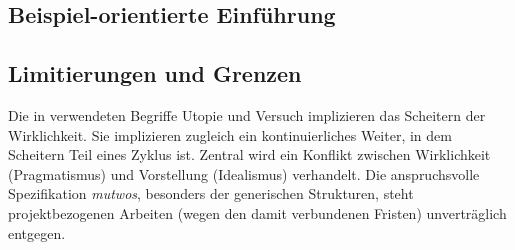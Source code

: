 \documentclass[12pt,a4paper,ngerman]{article}
\begin{document}

\subsection{Beispiel-orientierte Einführung}

%
%
%
%
%
%
%












\subsection{Limitierungen und Grenzen}
\label{limitsAndBorders}

Die in \emph{} verwendeten Begriffe Utopie und Versuch implizieren das Scheitern der Wirklichkeit.
Sie implizieren zugleich ein kontinuierliches Weiter, in dem Scheitern Teil eines Zyklus ist.
Zentral wird ein Konflikt zwischen Wirklichkeit (Pragmatismus) und Vorstellung (Idealismus) verhandelt.
Die anspruchsvolle Spezifikation \emph{mutwos}, besonders der generischen Strukturen, steht projektbezogenen Arbeiten (wegen den damit verbundenen Fristen) unverträglich entgegen.
\end{document}
